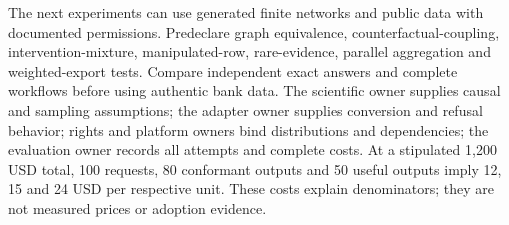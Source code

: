 The next experiments can use generated finite networks and public data with documented permissions. Predeclare graph equivalence, counterfactual-coupling, intervention-mixture, manipulated-row, rare-evidence, parallel aggregation and weighted-export tests. Compare independent exact answers and complete workflows before using authentic bank data. The scientific owner supplies causal and sampling assumptions; the adapter owner supplies conversion and refusal behavior; rights and platform owners bind distributions and dependencies; the evaluation owner records all attempts and complete costs. At a stipulated 1,200 USD total, 100 requests, 80 conformant outputs and 50 useful outputs imply 12, 15 and 24 USD per respective unit. These costs explain denominators; they are not measured prices or adoption evidence.~\citep{exec24_bnlearn_contract}
